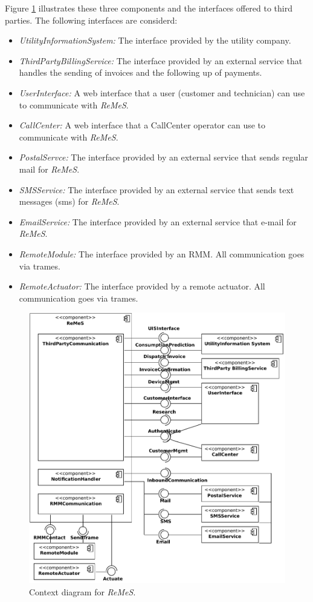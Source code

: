 \documentclass[a4paper,10pt]{article}
\newcommand{\rem}{\emph{ReMeS}\xspace}
\begin{document}
Figure \ref{fig:cc-context} illustrates these three components and the interfaces offered to third parties.
The following interfaces are considerd:
\begin{itemize}
	\item \emph{UtilityInformationSystem:} The interface provided by the utility company.
    \item \emph{ThirdPartyBillingService:} The interface provided by an external service that handles the sending of invoices and the following up of payments.
    \item \emph{UserInterface:} A web interface that a user (customer and technician) can use to communicate with \rem.
    \item \emph{CallCenter:} A web interface that a CallCenter operator can use to communicate with \rem.
    \item \emph{PostalServce:} The interface provided by an external service that sends regular mail for \rem.
    \item \emph{SMSService:} The interface provided by an external service that sends text messages (sms) for \rem.
    \item \emph{EmailService:} The interface provided by an external service that e-mail for \rem.
    \item \emph{RemoteModule:} The interface provided by an RMM. All communication goes via trames.
    \item \emph{RemoteActuator:} The interface provided by a remote actuator. All communication goes via trames.
\end{itemize}


\begin{figure}[!htp]
    \centering
    \includegraphics[width=\textwidth]{Context_ Main}
    \caption{Context diagram for \rem.
        }\label{fig:cc-context}
\end{figure}
\end{document}
